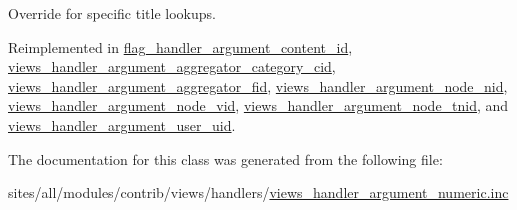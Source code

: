 Override for specific title lookups. 

Reimplemented in \hyperlink{classflag__handler__argument__content__id_d4164484998d7e2eff1a1cb233189384}{flag\_\-handler\_\-argument\_\-content\_\-id}, \hyperlink{classviews__handler__argument__aggregator__category__cid_aaf79328b4ec709281563e275f9a7df2}{views\_\-handler\_\-argument\_\-aggregator\_\-category\_\-cid}, \hyperlink{classviews__handler__argument__aggregator__fid_4d5f8aef22b4b3431c92fe2a496d9789}{views\_\-handler\_\-argument\_\-aggregator\_\-fid}, \hyperlink{classviews__handler__argument__node__nid_7c448ef89d94d7b103a162128ee9bbf8}{views\_\-handler\_\-argument\_\-node\_\-nid}, \hyperlink{classviews__handler__argument__node__vid_174a060cd5fb97db7991708db67e8724}{views\_\-handler\_\-argument\_\-node\_\-vid}, \hyperlink{classviews__handler__argument__node__tnid_4b22c61185c2c55b8fbfe40b4e131d69}{views\_\-handler\_\-argument\_\-node\_\-tnid}, and \hyperlink{classviews__handler__argument__user__uid_9ab9aa6bd71e9a2fa2a2c82a88f9dbff}{views\_\-handler\_\-argument\_\-user\_\-uid}.

The documentation for this class was generated from the following file:\begin{CompactItemize}
\item 
sites/all/modules/contrib/views/handlers/\hyperlink{views__handler__argument__numeric_8inc}{views\_\-handler\_\-argument\_\-numeric.inc}\end{CompactItemize}
